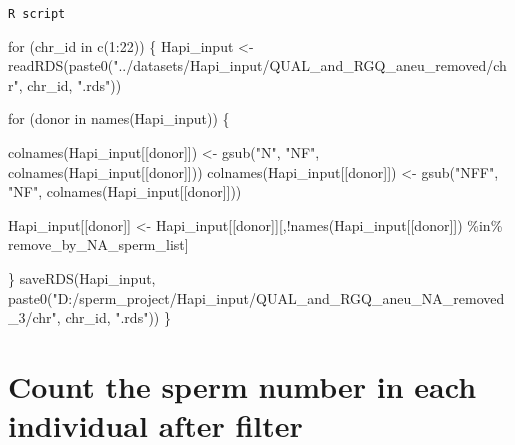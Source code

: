 \documentclass[
  letterpaper,
  DIV=11,
  numbers=noendperiod]{scrreprt}
\newenvironment{Shaded}{\begin{snugshade}}{\end{snugshade}}
\newcommand{\ControlFlowTok}[1]{\textcolor[rgb]{0.00,0.23,0.31}{#1}}
\newcommand{\DecValTok}[1]{\textcolor[rgb]{0.68,0.00,0.00}{#1}}
\newcommand{\FunctionTok}[1]{\textcolor[rgb]{0.28,0.35,0.67}{#1}}
\newcommand{\NormalTok}[1]{\textcolor[rgb]{0.00,0.23,0.31}{#1}}
\newcommand{\OtherTok}[1]{\textcolor[rgb]{0.00,0.23,0.31}{#1}}
\newcommand{\SpecialCharTok}[1]{\textcolor[rgb]{0.37,0.37,0.37}{#1}}
\newcommand{\StringTok}[1]{\textcolor[rgb]{0.13,0.47,0.30}{#1}}
\begin{document}
\begin{codelisting}

\caption{\texttt{R script}}

\begin{Shaded}
\begin{Highlighting}[]
\ControlFlowTok{for}\NormalTok{ (chr\_id }\ControlFlowTok{in} \FunctionTok{c}\NormalTok{(}\DecValTok{1}\SpecialCharTok{:}\DecValTok{22}\NormalTok{)) \{}
\NormalTok{  Hapi\_input }\OtherTok{\textless{}{-}} \FunctionTok{readRDS}\NormalTok{(}\FunctionTok{paste0}\NormalTok{(}\StringTok{"../datasets/Hapi\_input/QUAL\_and\_RGQ\_aneu\_removed/chr"}\NormalTok{, chr\_id, }\StringTok{".rds"}\NormalTok{))}
  
  \ControlFlowTok{for}\NormalTok{ (donor }\ControlFlowTok{in} \FunctionTok{names}\NormalTok{(Hapi\_input)) \{}
    
    \FunctionTok{colnames}\NormalTok{(Hapi\_input[[donor]]) }\OtherTok{\textless{}{-}} \FunctionTok{gsub}\NormalTok{(}\StringTok{"N"}\NormalTok{, }\StringTok{"NF"}\NormalTok{, }\FunctionTok{colnames}\NormalTok{(Hapi\_input[[donor]]))}
    \FunctionTok{colnames}\NormalTok{(Hapi\_input[[donor]]) }\OtherTok{\textless{}{-}} \FunctionTok{gsub}\NormalTok{(}\StringTok{"NFF"}\NormalTok{, }\StringTok{"NF"}\NormalTok{, }\FunctionTok{colnames}\NormalTok{(Hapi\_input[[donor]]))}
    
\NormalTok{    Hapi\_input[[donor]] }\OtherTok{\textless{}{-}}\NormalTok{ Hapi\_input[[donor]][,}\SpecialCharTok{!}\FunctionTok{names}\NormalTok{(Hapi\_input[[donor]]) }\SpecialCharTok{\%in\%}\NormalTok{ remove\_by\_NA\_sperm\_list]}
    
\NormalTok{  \}}
  \FunctionTok{saveRDS}\NormalTok{(Hapi\_input, }\FunctionTok{paste0}\NormalTok{(}\StringTok{"D:/sperm\_project/Hapi\_input/QUAL\_and\_RGQ\_aneu\_NA\_removed\_3/chr"}\NormalTok{, chr\_id, }\StringTok{".rds"}\NormalTok{))}
\NormalTok{\}}
\end{Highlighting}
\end{Shaded}

\end{codelisting}

\hypertarget{count-the-sperm-number-in-each-individual-after-filter}{%
\section{Count the sperm number in each individual after
filter}\label{count-the-sperm-number-in-each-individual-after-filter}}
\end{document}
